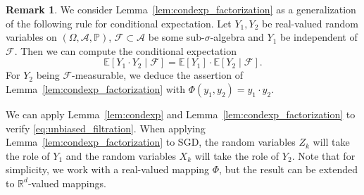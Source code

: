 \documentclass[12pt,openany]{book}
\theoremstyle{definition}
\newtheorem{remark}[thm]{Remark}
\theoremstyle{definition}
\newcommand{\E}{\mathbb{E}}
\newcommand{\R}{\mathbb{R}}
\begin{document}
\begin{remark}
We consider Lemma~\ref{lem:condexp_factorization} as a generalization of the following rule for conditional expectation. Let $Y_1,Y_2$ be real-valued random variables on $(\Omega,\mathcal A,\mathbb P)$, $\mathcal F\subset \mathcal A$ be some sub-$\sigma$-algebra and $Y_1$ be independent of $\mathcal F$. Then we can compute the conditional expectation
\[\E[Y_1\cdot Y_2\mid\mathcal F] = \E[Y_1]\cdot \E[Y_2\mid \mathcal F].\] 
For $Y_2$ being $\mathcal F$-measurable, we deduce the assertion of Lemma~\ref{lem:condexp_factorization} with $\Phi(y_1,y_2) = y_1\cdot y_2$.

We can apply Lemma~\ref{lem:condexp} and Lemma~\ref{lem:condexp_factorization} to verify \eqref{eq:unbiased_filtration}. When applying Lemma~\ref{lem:condexp_factorization} to SGD, the random variables $Z_k$ will take the role of $Y_1$ and the random variables $X_k$ will take the role of $Y_2$. Note that for simplicity, we work with a real-valued mapping $\Phi$, but the result can be extended to $\R^d$-valued mappings.
\end{remark}
\end{document}
